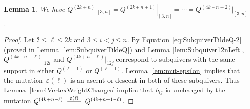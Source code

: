 \documentclass[11pt, letterpaper]{amsart}
\newtheorem{lemma}[theorem]{Lemma}
\theoremstyle{definition}
\numberwithin{equation}{section}
\newcommand{\mutation}[1]{\stackrel{#1}{\rule[.5ex]{2em}{0.5pt}}}
\begin{document}
\begin{lemma}
\label{lem:binUnchanged}
We have $Q^{(2k+n)}|_{[3,n]} = Q^{(2k+n+1)}|_{[3,n]} = \cdots = Q^{(4k+n-2)}|_{[3,n]}$. 
\end{lemma}
\begin{proof}
Let $2 \leq \ell \leq 2k$ and $3 \leq i < j \leq n$.  
By Equation~\eqref{eq:SubquiverTildeQ-2} (proved in Lemma~\ref{lem:SubquiverTildeQ}) and Lemma~\ref{lem:Subquiver12nLeft}, 
$Q^{(4k+n-\ell)}|_{12i}$ and $Q^{(4k+n-\ell)}|_{12j}$ correspond to subquivers with the same support in either $Q^{(\ell+1)}$ or $Q^{(\ell-1)}$. %
Lemma~\ref{lem:mut-epsilon} implies that the mutation~$\varepsilon(\ell)$ is an ascent or descent in both of these subquivers. %
Thus Lemma~\ref{lem:4VertexWeightChanges} implies that~$b_{ij}$ is unchanged by the mutation 
$Q^{(4k+n-\ell)}~\mutation{\varepsilon(\ell)}~Q^{(4k+n+1-\ell)}$. 
\end{proof}
\end{document}
